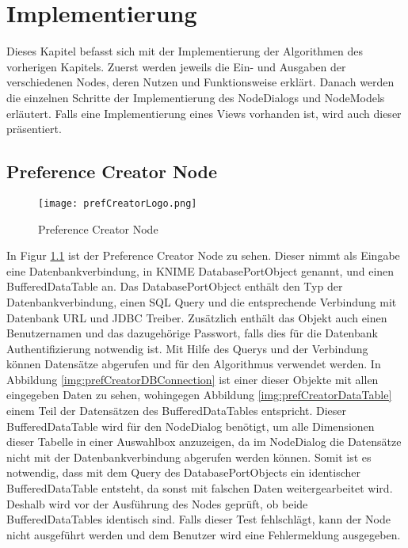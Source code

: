 \chapter{Implementierung}
\label{ch:Implementierung}
Dieses Kapitel befasst sich mit der Implementierung der Algorithmen des vorherigen Kapitels. Zuerst werden jeweils die Ein- und Ausgaben der verschiedenen Nodes, deren Nutzen und Funktionsweise erklärt. 
Danach werden die einzelnen Schritte der Implementierung des NodeDialogs und NodeModels erläutert. Falls eine Implementierung eines Views vorhanden ist, wird auch dieser präsentiert.
\section{Preference Creator Node}
\label{ch:Implementierung:sec:prefCreatorNode}
\begin{figure}[H]
	\centering
	\texttt{[image: prefCreatorLogo.png]}
	\caption{Preference Creator Node}
	\label{img:prefCreatorLogo}
\end{figure} 

In Figur \ref{img:prefCreatorLogo} ist der Preference Creator Node zu sehen. Dieser nimmt als Eingabe eine Datenbankverbindung, in KNIME DatabasePortObject genannt, und einen BufferedDataTable an. Das DatabasePortObject enthält den Typ der Datenbankverbindung, einen SQL Query und die entsprechende Verbindung mit Datenbank URL und JDBC Treiber. Zusätzlich enthält das Objekt auch einen Benutzernamen und das dazugehörige Passwort, falls dies für die Datenbank Authentifizierung notwendig ist. Mit Hilfe des Querys und der Verbindung können Datensätze abgerufen und für den Algorithmus verwendet werden. 
In Abbildung \ref{img:prefCreatorDBConnection} ist einer dieser Objekte mit allen eingegeben Daten zu sehen, wohingegen Abbildung \ref{img:prefCreatorDataTable} einem Teil der Datensätzen des BufferedDataTables entspricht. Dieser BufferedDataTable wird für den NodeDialog benötigt, um alle Dimensionen dieser Tabelle in einer Auswahlbox anzuzeigen, da im NodeDialog die Datensätze nicht mit der Datenbankverbindung abgerufen werden können. Somit ist es notwendig, dass mit dem Query des DatabasePortObjects ein identischer BufferedDataTable entsteht, da sonst mit falschen Daten weitergearbeitet wird. Deshalb wird vor der Ausführung des Nodes geprüft, ob beide BufferedDataTables identisch sind. Falls dieser Test fehlschlägt, kann der Node nicht ausgeführt werden und dem Benutzer wird eine Fehlermeldung ausgegeben.

